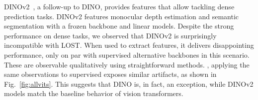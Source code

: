 DINOv2~\citep{oquab2023dinov2}, a follow-up to DINO, provides features that allow tackling dense prediction tasks.
DINOv2 features  monocular depth estimation and semantic segmentation with a frozen backbone and linear models.
Despite the strong performance on dense tasks, we observed that DINOv2 is surprisingly incompatible with LOST.
When used to extract features, it delivers disappointing performance, only on par with supervised alternative backbones in this scenario. 
These are observable qualitatively using straightforward methods. 
, applying the same observations to supervised  exposes similar artifacts, as shown in Fig.~\ref{fig:allvits}.
This suggests that DINO is, in fact, an exception, while DINOv2 models match the baseline behavior of vision transformers. 

